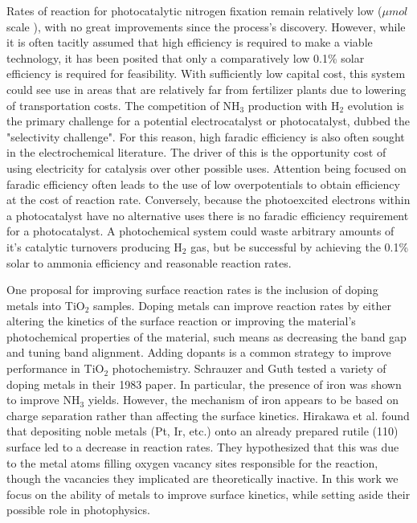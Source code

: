 \documentclass[catalysts,article,submit,moreauthors,pdftex,10pt,a4paper]{mdpi}
\theoremstyle{mdpi}
\newcounter{ex}
\newcounter{re}
\theoremstyle{mdpidefinition}
\begin{document}
Rates of reaction for photocatalytic nitrogen fixation remain relatively low ($\mu mol$ scale \cite{Hirakawa_2017}), with no great improvements since the process's discovery. However, while it is often tacitly assumed that high efficiency is required to make a viable technology, it has been posited that only a comparatively low 0.1\% solar efficiency is required for feasibility.\cite{Comer_2019,Medford_2017} With sufficiently low capital cost, this system could see use in areas that are relatively far from fertilizer plants due to lowering of transportation costs. The competition of NH$_3$ production with H$_2$ evolution is the primary challenge for a potential electrocatalyst or photocatalyst, dubbed the "selectivity challenge".\cite{Singh_2017} For this reason, high faradic efficiency is also often sought in the electrochemical literature.\cite{McPherson_2019} The driver of this is the opportunity cost of using electricity for catalysis over other possible uses. Attention being focused on faradic efficiency often leads to the use of low overpotentials to obtain efficiency at the cost of reaction rate. Conversely, because the photoexcited electrons within a photocatalyst have no alternative uses there is no faradic efficiency requirement for a photocatalyst. A photochemical system could waste arbitrary amounts of it's catalytic turnovers producing H$_2$ gas, but be successful by achieving the 0.1\% solar to ammonia efficiency and reasonable reaction rates. %

One proposal for improving surface reaction rates is the inclusion of doping metals into TiO$_2$ samples. Doping metals can improve reaction rates by either altering the kinetics of the surface reaction or improving the material's photochemical properties of the material, such means as decreasing the band gap and tuning band alignment. Adding dopants is a common strategy to improve performance in TiO$_2$ photochemistry.\cite{Schneider_2014, Li_2007, Dozzi_2013, Diebold2003} Schrauzer and Guth tested a variety of doping metals in their 1983 paper.\cite{Schrauzer_1983} In particular, the presence of iron was shown to improve NH$_3$ yields\cite{Schrauzer_1977,Augugliaro_1982}. However, the mechanism of iron appears to be based on charge separation rather than affecting the surface kinetics.\cite{Comer_2018} Hirakawa et al. found that depositing noble metals (Pt, Ir, etc.) onto an already prepared rutile (110) surface led to a decrease in reaction rates.\cite{Hirakawa_2017} They hypothesized that this was due to the metal atoms filling oxygen vacancy sites responsible for the reaction, though the vacancies they implicated are theoretically inactive.\cite{Comer_2018} In this work we focus on the ability of metals to improve surface kinetics, while setting aside their possible role in photophysics.
\end{document}
